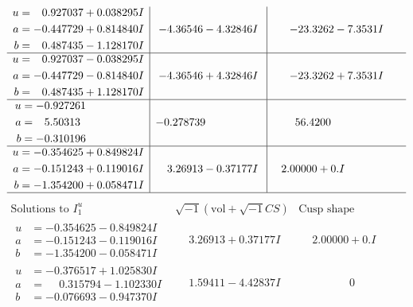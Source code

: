 \documentclass[1p]{elsarticle_modified}
\theoremstyle{definition}
\newcommand{\I}{\sqrt{-1}}
\begin{document}
$$\begin{array}{c|c|c}
\begin{aligned}
u &= \phantom{-}0.927037 + 0.038295 I \\
a &= -0.447729 + 0.814840 I \\
b &= \phantom{-}0.487435 - 1.128170 I\end{aligned}
 & -4.36546 - 4.32846 I & -23.3262 - 7.3531 I \\ \hline\begin{aligned}
u &= \phantom{-}0.927037 - 0.038295 I \\
a &= -0.447729 - 0.814840 I \\
b &= \phantom{-}0.487435 + 1.128170 I\end{aligned}
 & -4.36546 + 4.32846 I & -23.3262 + 7.3531 I \\ \hline\begin{aligned}
u &= -0.927261\phantom{ +0.000000I} \\
a &= \phantom{-}5.50313\phantom{ +0.000000I} \\
b &= -0.310196\phantom{ +0.000000I}\end{aligned}
 & -0.278739\phantom{ +0.000000I} & \phantom{-}56.4200\phantom{ +0.000000I} \\ \hline\begin{aligned}
u &= -0.354625 + 0.849824 I \\
a &= -0.151243 + 0.119016 I \\
b &= -1.354200 + 0.058471 I\end{aligned}
 & \phantom{-}3.26913 - 0.37177 I & \phantom{-}2.00000 + 0. I\phantom{ +0.000000I}\\
 \hline 
 \end{array}$$\newpage$$\begin{array}{c|c|c}  
\text{Solutions to }I^u_{1}& \I (\text{vol} + \sqrt{-1}CS) & \text{Cusp shape}\\
 \hline 
\begin{aligned}
u &= -0.354625 - 0.849824 I \\
a &= -0.151243 - 0.119016 I \\
b &= -1.354200 - 0.058471 I\end{aligned}
 & \phantom{-}3.26913 + 0.37177 I & \phantom{-}2.00000 + 0. I\phantom{ +0.000000I} \\ \hline\begin{aligned}
u &= -0.376517 + 1.025830 I \\
a &= \phantom{-}0.315794 - 1.102330 I \\
b &= -0.076693 - 0.947370 I\end{aligned}
 & \phantom{-}1.59411 - 4.42837 I & \phantom{-0.000000 } 0 \\ \hline\begin{aligned}

\end{aligned}
\end{array}$$
\end{document}
